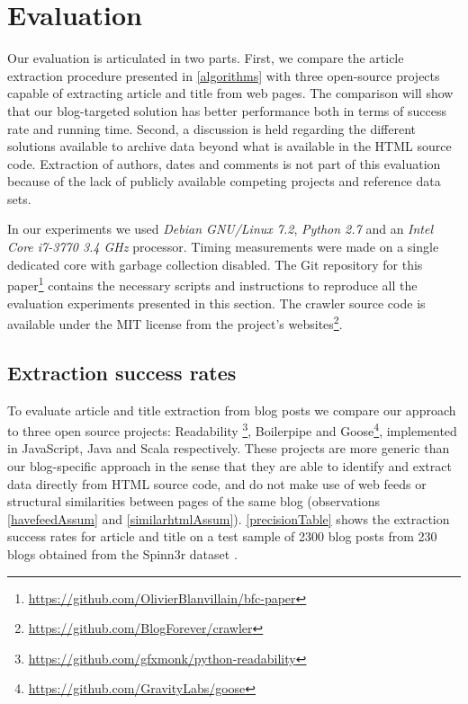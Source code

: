 \section{Evaluation}
\label{evaluation}

Our evaluation is articulated in two parts. First, we compare the article extraction procedure presented in \autoref{algorithms} with three open-source projects capable of extracting article and title from web pages. The comparison will show that our blog-targeted solution has better performance both in terms of success rate and running time. Second, a discussion is held regarding the different solutions available to archive data beyond what is available in the HTML source code. Extraction of authors, dates and comments is not part of this evaluation because of the lack of publicly available competing projects and reference data sets.

In our experiments we used \emph{Debian GNU/Linux 7.2}, \emph{Python 2.7} and an \emph{Intel Core i7-3770 3.4 GHz} processor. Timing measurements were made on a single dedicated core with garbage collection disabled. The Git repository for this paper\footnote{\url{https://github.com/OlivierBlanvillain/bfc-paper}} contains the necessary scripts and instructions to reproduce all the evaluation experiments presented in this section. The crawler source code is available under the MIT license from the project's websites\footnote{\url{https://github.com/BlogForever/crawler}}.

\subsection{Extraction success rates}
To evaluate article and title extraction from blog posts we compare our approach to three open source projects: Readability \footnote{\url{https://github.com/gfxmonk/python-readability}}, Boilerpipe \cite{kohlschuetter2010} and Goose\footnote{\url{https://github.com/GravityLabs/goose}}, implemented in JavaScript, Java and Scala respectively. These projects are more generic than our blog-specific approach in the sense that they are able to identify and extract data directly from HTML source code, and do not make use of web feeds or structural similarities between pages of the same blog (observations \ref{havefeedAssum} and \ref{similarhtmlAssum}). \autoref{precisionTable} shows the extraction success rates for article and title on a test sample of 2300 blog posts from 230 blogs obtained from the Spinn3r dataset \cite{burton2011}.

